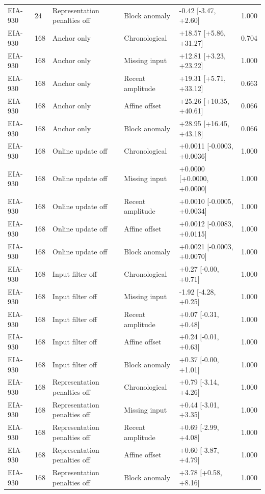 {\begin{longtable}{lllp{2.5cm}p{4.1cm}r}
EIA-930 & 24 & Representation penalties off & Block anomaly & -0.42 [-3.47, +2.60] & 1.000 \\
EIA-930 & 168 & Anchor only & Chronological & +18.57 [+5.86, +31.27] & 0.704 \\
EIA-930 & 168 & Anchor only & Missing input & +12.81 [+3.23, +23.22] & 1.000 \\
EIA-930 & 168 & Anchor only & Recent amplitude & +19.31 [+5.71, +33.12] & 0.663 \\
EIA-930 & 168 & Anchor only & Affine offset & +25.26 [+10.35, +40.61] & 0.066 \\
EIA-930 & 168 & Anchor only & Block anomaly & +28.95 [+16.45, +43.18] & 0.066 \\
EIA-930 & 168 & Online update off & Chronological & +0.0011 [-0.0003, +0.0036] & 1.000 \\
EIA-930 & 168 & Online update off & Missing input & +0.0000 [+0.0000, +0.0000] & 1.000 \\
EIA-930 & 168 & Online update off & Recent amplitude & +0.0010 [-0.0005, +0.0034] & 1.000 \\
EIA-930 & 168 & Online update off & Affine offset & +0.0012 [-0.0083, +0.0115] & 1.000 \\
EIA-930 & 168 & Online update off & Block anomaly & +0.0021 [-0.0003, +0.0070] & 1.000 \\
EIA-930 & 168 & Input filter off & Chronological & +0.27 [-0.00, +0.71] & 1.000 \\
EIA-930 & 168 & Input filter off & Missing input & -1.92 [-4.28, +0.25] & 1.000 \\
EIA-930 & 168 & Input filter off & Recent amplitude & +0.07 [-0.31, +0.48] & 1.000 \\
EIA-930 & 168 & Input filter off & Affine offset & +0.24 [-0.01, +0.63] & 1.000 \\
EIA-930 & 168 & Input filter off & Block anomaly & +0.37 [-0.00, +1.01] & 1.000 \\
EIA-930 & 168 & Representation penalties off & Chronological & +0.79 [-3.14, +4.26] & 1.000 \\
EIA-930 & 168 & Representation penalties off & Missing input & +0.44 [-3.01, +3.35] & 1.000 \\
EIA-930 & 168 & Representation penalties off & Recent amplitude & +0.69 [-2.99, +4.08] & 1.000 \\
EIA-930 & 168 & Representation penalties off & Affine offset & +0.60 [-3.87, +4.79] & 1.000 \\
EIA-930 & 168 & Representation penalties off & Block anomaly & +3.78 [+0.58, +8.16] & 1.000 \\

\end{longtable}}
